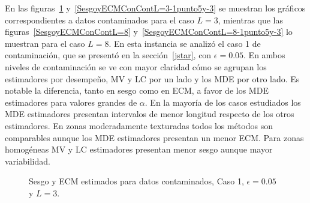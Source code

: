 En las figuras~\ref{SesgoyECMConContL=3} y~\ref{SesgoyECMConContL=3-1punto5y-3} se muestran los gráficos correspondientes a datos contaminados para el caso $L=3$, mientras que las figuras~\ref{SesgoyECMConContL=8} y~\ref{SesgoyECMConContL=8-1punto5y-3} lo muestran para el caso $L=8$. En esta instancia se analizó el caso 1 de contaminación, que se presentó en la sección~\ref{jstar}, con $\epsilon=0.05$. En ambos niveles de contaminación se ve con mayor claridad cómo se agrupan los estimadores por desempeño, MV y LC por un lado y los MDE por otro lado. Es notable la diferencia, tanto en sesgo como en ECM, a favor de los MDE estimadores para valores grandes de $\alpha$. En la mayoría de los casos estudiados los MDE estimadores presentan intervalos de menor longitud respecto de los otros estimadores. En zonas moderadamente texturadas todos los métodos son comparables aunque los MDE estimadores presentan un menor ECM. Para zonas homogéneas MV y LC estimadores presentan menor sesgo aunque mayor variabilidad.

\begin{figure}[htb]
	\caption{\label{SesgoyECMConContL=3}\small Sesgo y ECM estimados para datos contaminados, Caso 1, $\epsilon=0.05$ y $ L=3$.}
\end{figure}

